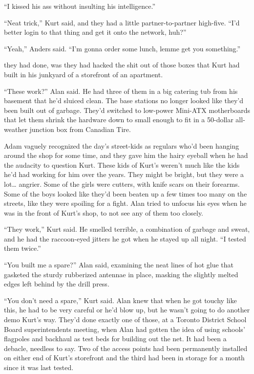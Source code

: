 ``I kissed his ass without insulting his intelligence.''

``Neat trick,'' Kurt said, and they had a little partner-to-partner
high-five.  ``I'd better login to that thing and get it onto the
network, huh?''

``Yeah,'' Anders said.  ``I'm gonna order some lunch, lemme get you
something.''

 they had done, was they had hacked the shit out of those boxes
that Kurt had built in his junkyard of a storefront of an apartment.

``These work?'' Alan said.  He had three of them in a big catering tub
from his basement that he'd sluiced clean.  The base stations no
longer looked like they'd been built out of garbage.  They'd switched
to low-power Mini-ATX motherboards that let them shrink the hardware
down to small enough to fit in a 50-dollar all-weather junction box
from Canadian Tire.

Adam vaguely recognized the day's street-kids as regulars who'd been
hanging around the shop for some time, and they gave him the hairy
eyeball when he had the audacity to question Kurt.  These kids of
Kurt's weren't much like the kids he'd had working for him over the
years.  They might be bright, but they were a lot\ldots{}  angrier.  Some
of the girls were cutters, with knife scars on their forearms.  Some
of the boys looked like they'd been beaten up a few times too many on
the streets, like they were spoiling for a fight.  Alan tried to
unfocus his eyes when he was in the front of Kurt's shop, to not see
any of them too closely.

``They work,'' Kurt said.  He smelled terrible, a combination of
garbage and sweat, and he had the raccoon-eyed jitters he got when he
stayed up all night.  ``I tested them twice.''

``You built me a spare?'' Alan said, examining the neat lines of hot
glue that gasketed the sturdy rubberized antennae in place, masking
the slightly melted edges left behind by the drill press.

``You don't need a spare,'' Kurt said.  Alan knew that when he got
touchy like this, he had to be very careful or he'd blow up, but he
wasn't going to do another demo Kurt's way.  They'd done exactly one
of those, at a Toronto District School Board superintendents meeting,
when Alan had gotten the idea of using schools' flagpoles and backhaul
as test beds for building out the net.  It had been a debacle,
needless to say.  Two of the access points had been permanently
installed on either end of Kurt's storefront and the third had been in
storage for a month since it was last tested.


